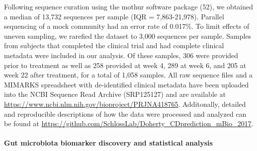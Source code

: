 \documentclass[12pt,]{article}
\let\oldparagraph\paragraph
\renewcommand{\paragraph}[1]{\oldparagraph{#1}\mbox{}}
\begin{document}
Following sequence curation using the mothur software package (52), we
obtained a median of 13,732 sequences per sample (IQR = 7,863-21,978).
Parallel sequencing of a mock community had an error rate of 0.017\%. To
limit effects of uneven sampling, we rarefied the dataset to 3,000
sequences per sample. Samples from subjects that completed the clinical
trial and had complete clinical metadata were included in our analysis.
Of these samples, 306 were provided prior to treatment as well as 258
provided at week 4, 289 at week 6, and 205 at week 22 after treatment,
for a total of 1,058 samples. All raw sequence files and a MIMARKS
spreadsheet with de-identified clinical metadata have been uploaded into
the NCBI Sequence Read Archive (SRP125127) and are available at
\url{https://www.ncbi.nlm.nih.gov/bioproject/PRJNA418765}. Additonally,
detailed and reproducible descriptions of how the data were processed
and analyzed can be found at
\url{https://github.com/SchlossLab/Doherty_CDprediction_mBio_2017}.

\paragraph{Gut microbiota biomarker discovery and statistical
analysis}\label{gut-microbiota-biomarker-discovery-and-statistical-analysis}
\end{document}
